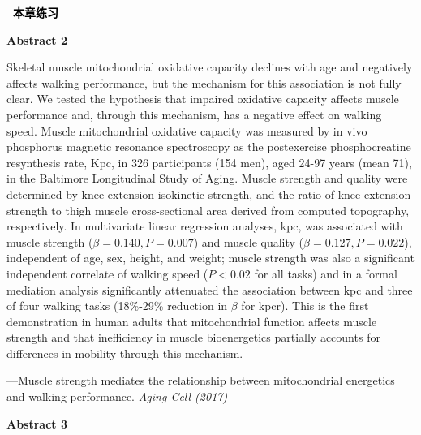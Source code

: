 \documentclass[a4paper]{ctexbook}
\newenvironment{problemset}[1][本章练习]{
  \begin{center}
    \phantomsection\addcontentsline{toc}{section}{\texorpdfstring{本章练习}{Exercice}}
    \markright{#1}
    \textcolor{black}{\Large\bfseries\adftripleflourishleft~#1~\adftripleflourishright}
  \end{center}
  \begin{enumerate}}{
  \end{enumerate}}
\begin{document}
\begin{problemset}
  \textbf{Abstract 2}
  
  \hspace*{2em}Skeletal muscle mitochondrial oxidative capacity declines with age and negatively affects walking performance, but the mechanism for this association is not fully clear. We tested the hypothesis that impaired oxidative capacity affects muscle performance and, through this mechanism, has a negative effect on walking speed. Muscle mitochondrial oxidative capacity was measured by in vivo phosphorus magnetic resonance spectroscopy as the postexercise phosphocreatine resynthesis rate, Kpc, in 326 participants (154 men), aged 24-97 years (mean 71), in the Baltimore Longitudinal Study of Aging. Muscle strength and quality were determined by knee extension isokinetic strength, and the ratio of knee extension strength to thigh muscle cross-sectional area derived from computed topography, respectively. In multivariate linear regression analyses, kpc, was associated with muscle strength ($\beta=0. 140, P=0.007$) and muscle quality ($\beta=0.127, P=0.022$), independent of age, sex, height, and weight; muscle strength was also a significant independent correlate of walking speed ($P<0. 02$ for all tasks) and in a formal mediation analysis significantly attenuated the association between kpc and three of four walking tasks (18\%-29\% reduction in $\beta$ for kpcr). This is the first demonstration in human adults that mitochondrial function affects muscle strength and that inefficiency in muscle bioenergetics partially accounts for differences in mobility through this mechanism.

  \begin{flushright}
    ---Muscle strength mediates the relationship between mitochondrial energetics and walking performance. \emph{Aging Cell (2017)}
  \end{flushright}

  \textbf{Abstract 3}


\end{problemset}
\end{document}

